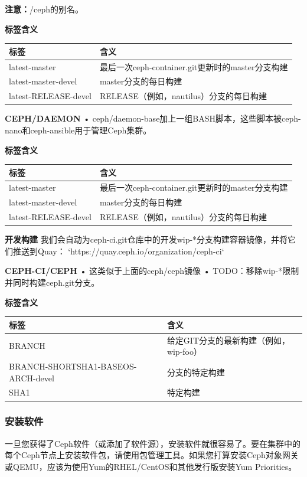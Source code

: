 \documentclass[12pt,UTF8]{ctexbook}
\begin{document}
\textbf{注意：}/ceph的别名。

\textbf{标签含义}
\begin{tabular}{ll}
\textbf{标签} & \textbf{含义} \\
\hline
latest-master & 最后一次ceph-container.git更新时的master分支构建 \\
latest-master-devel & master分支的每日构建 \\
latest-RELEASE-devel & RELEASE（例如，nautilus）分支的每日构建 \\
\end{tabular}

\textbf{CEPH/DAEMON}
• ceph/daemon-base加上一组BASH脚本，这些脚本被ceph-nano和ceph-ansible用于管理Ceph集群。

\textbf{标签含义}
\begin{tabular}{ll}
\textbf{标签} & \textbf{含义} \\
\hline
latest-master & 最后一次ceph-container.git更新时的master分支构建 \\
latest-master-devel & master分支的每日构建 \\
latest-RELEASE-devel & RELEASE（例如，nautilus）分支的每日构建 \\
\end{tabular}

\textbf{开发构建}
我们会自动为ceph-ci.git仓库中的开发wip-*分支构建容器镜像，并将它们推送到Quay：
`https://quay.ceph.io/organization/ceph-ci`

\textbf{CEPH-CI/CEPH}
• 这类似于上面的ceph/ceph镜像
• TODO：移除wip-*限制并同时构建ceph.git分支。

\textbf{标签含义}
\begin{tabular}{ll}
\textbf{标签} & \textbf{含义} \\
\hline
BRANCH & 给定GIT分支的最新构建（例如，wip-foo） \\
BRANCH-SHORTSHA1-BASEOS-ARCH-devel & 分支的特定构建 \\
SHA1 & 特定构建 \\
\end{tabular}

\subsubsection{安装软件}
一旦您获得了Ceph软件（或添加了软件源），安装软件就很容易了。要在集群中的每个Ceph节点上安装软件包，请使用包管理工具。如果您打算安装Ceph对象网关或QEMU，应该为使用Yum的RHEL/CentOS和其他发行版安装Yum Priorities。
\end{document}
